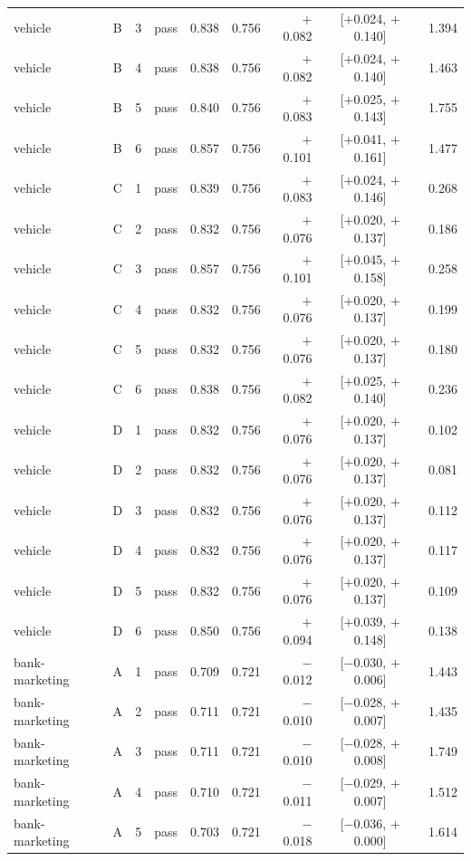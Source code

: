 {\begin{longtable}{lccl rrrcr}
vehicle & B & 3 & pass & 0.838 & 0.756 & $+$0.082 & [$+$0.024, $+$0.140] & 1.394 \\
vehicle & B & 4 & pass & 0.838 & 0.756 & $+$0.082 & [$+$0.024, $+$0.140] & 1.463 \\
vehicle & B & 5 & pass & 0.840 & 0.756 & $+$0.083 & [$+$0.025, $+$0.143] & 1.755 \\
vehicle & B & 6 & pass & 0.857 & 0.756 & $+$0.101 & [$+$0.041, $+$0.161] & 1.477 \\
\addlinespace[2pt]
vehicle & C & 1 & pass & 0.839 & 0.756 & $+$0.083 & [$+$0.024, $+$0.146] & 0.268 \\
vehicle & C & 2 & pass & 0.832 & 0.756 & $+$0.076 & [$+$0.020, $+$0.137] & 0.186 \\
vehicle & C & 3 & pass & 0.857 & 0.756 & $+$0.101 & [$+$0.045, $+$0.158] & 0.258 \\
vehicle & C & 4 & pass & 0.832 & 0.756 & $+$0.076 & [$+$0.020, $+$0.137] & 0.199 \\
vehicle & C & 5 & pass & 0.832 & 0.756 & $+$0.076 & [$+$0.020, $+$0.137] & 0.180 \\
vehicle & C & 6 & pass & 0.838 & 0.756 & $+$0.082 & [$+$0.025, $+$0.140] & 0.236 \\
\addlinespace[2pt]
vehicle & D & 1 & pass & 0.832 & 0.756 & $+$0.076 & [$+$0.020, $+$0.137] & 0.102 \\
vehicle & D & 2 & pass & 0.832 & 0.756 & $+$0.076 & [$+$0.020, $+$0.137] & 0.081 \\
vehicle & D & 3 & pass & 0.832 & 0.756 & $+$0.076 & [$+$0.020, $+$0.137] & 0.112 \\
vehicle & D & 4 & pass & 0.832 & 0.756 & $+$0.076 & [$+$0.020, $+$0.137] & 0.117 \\
vehicle & D & 5 & pass & 0.832 & 0.756 & $+$0.076 & [$+$0.020, $+$0.137] & 0.109 \\
vehicle & D & 6 & pass & 0.850 & 0.756 & $+$0.094 & [$+$0.039, $+$0.148] & 0.138 \\
\midrule
bank-marketing & A & 1 & pass & 0.709 & 0.721 & $-$0.012 & [$-$0.030, $+$0.006] & 1.443 \\
bank-marketing & A & 2 & pass & 0.711 & 0.721 & $-$0.010 & [$-$0.028, $+$0.007] & 1.435 \\
bank-marketing & A & 3 & pass & 0.711 & 0.721 & $-$0.010 & [$-$0.028, $+$0.008] & 1.749 \\
bank-marketing & A & 4 & pass & 0.710 & 0.721 & $-$0.011 & [$-$0.029, $+$0.007] & 1.512 \\
bank-marketing & A & 5 & pass & 0.703 & 0.721 & $-$0.018 & [$-$0.036, $+$0.000] & 1.614 \\

\end{longtable}}
